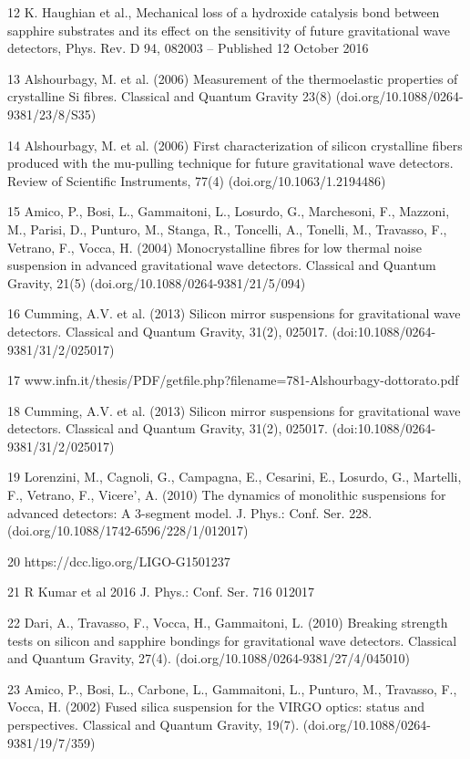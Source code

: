 12 K. Haughian et al., Mechanical loss of a hydroxide catalysis bond between sapphire substrates and its effect on the sensitivity of future gravitational wave detectors, Phys. Rev. D 94, 082003 – Published 12 October 2016

13 Alshourbagy, M. et al. (2006) Measurement of the thermoelastic properties of crystalline Si fibres. Classical and Quantum Gravity 23(8) (doi.org/10.1088/0264-9381/23/8/S35)

14 Alshourbagy, M. et al. (2006) First characterization of silicon crystalline fibers produced with the mu-pulling technique for future gravitational wave detectors. Review of Scientific Instruments, 77(4) (doi.org/10.1063/1.2194486)

15 Amico, P., Bosi, L., Gammaitoni, L., Losurdo, G., Marchesoni, F., Mazzoni, M., Parisi, D., Punturo, M., Stanga, R., Toncelli, A., Tonelli, M., Travasso, F., Vetrano, F., Vocca, H. (2004) Monocrystalline fibres for low thermal noise suspension in advanced gravitational wave detectors. Classical and Quantum Gravity, 21(5) (doi.org/10.1088/0264-9381/21/5/094)

16 Cumming, A.V. et al. (2013) Silicon mirror suspensions for gravitational wave detectors. Classical and Quantum Gravity, 31(2), 025017. (doi:10.1088/0264-9381/31/2/025017)

17 www.infn.it/thesis/PDF/getfile.php?filename=781-Alshourbagy-dottorato.pdf

18 Cumming, A.V. et al. (2013) Silicon mirror suspensions for gravitational wave detectors. Classical and Quantum Gravity, 31(2), 025017. (doi:10.1088/0264-9381/31/2/025017)

19 Lorenzini, M., Cagnoli, G., Campagna, E., Cesarini, E., Losurdo, G., Martelli, F., Vetrano, F., Vicere', A. (2010) The dynamics of monolithic suspensions for advanced detectors: A 3-segment model. J. Phys.: Conf. Ser. 228. (doi.org/10.1088/1742-6596/228/1/012017)

20 https://dcc.ligo.org/LIGO-G1501237

21 R Kumar et al 2016 J. Phys.: Conf. Ser. 716 012017

22 Dari, A., Travasso, F., Vocca, H., Gammaitoni, L. (2010) Breaking strength tests on silicon and sapphire bondings for gravitational wave detectors. Classical and Quantum Gravity, 27(4). (doi.org/10.1088/0264-9381/27/4/045010)

23 Amico, P., Bosi, L., Carbone, L., Gammaitoni, L., Punturo, M., Travasso, F., Vocca, H. (2002) Fused silica suspension for the VIRGO optics: status and perspectives. Classical and Quantum Gravity, 19(7). (doi.org/10.1088/0264-9381/19/7/359)

